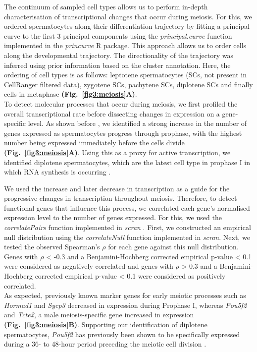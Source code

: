 The continuum of sampled cell types allows us to perform in-depth characterisation of transcriptional changes that occur during meiosis. 
For this, we ordered spermatocytes along their differentiation trajectory by fitting a principal curve \citep{Hastie1989} to the first 3 principal components using the \emph{principal.curve} function implemented in the \emph{princurve} R package. 
This approach allows us to order cells along the developmental trajectory. 
The directionality of the trajectory was inferred using prior information based on the cluster annotation. 
Here, the ordering of cell types is as follows: leptotene spermatocytes (SCs, not present in CellRanger filtered data), zygotene SCs, pachytene SCs, diplotene SCs and finally cells in metaphase \textbf{(Fig.~\ref{fig3:meiosis}A)}. \\

To detect molecular processes that occur during meiosis, we first profiled the overall transcriptional rate before dissecting changes in expression on a gene-specific level. 
As shown before \citep{Xia2018}, we identified a strong increase in the number of genes expressed as spermatocytes progress through prophase, with the highest number being expressed immediately before the cells divide \textbf{(Fig.~\ref{fig3:meiosis}A)}. 
Using this as a proxy for active transcription, we identified diplotene spermatocytes, which are the latest cell type in prophase I in which RNA synthesis is occurring \citep{Monesi1965}. 

\newpage

We used the increase and later decrease in transcription as a guide for the progressive changes in transcription throughout meiosis. 
Therefore, to detect functional genes that influence this process, we correlated each gene’s normalised expression level to the number of genes expressed. 
For this, we used the \emph{correlatePairs} function implemented in \emph{scran} \citep{Lun2016}. 
First, we constructed an empirical null distribution using the \emph{correlateNull} function implemented in \emph{scran}. 
Next, we tested the observed Spearman’s $\rho$ for each gene against this null distribution. 
Genes with $\rho$ < -0.3 and a Benjamini-Hochberg corrected empirical p-value < 0.1 were considered as negatively correlated and genes with $\rho$ > 0.3 and a Benjamini-Hochberg corrected empirical p-value < 0.1 were considered as positively correlated.\\

As expected, previously known marker genes for early meiotic processes such as \textit{Hormad1} and \textit{Sycp3} decreased in expression during Prophase I, whereas \textit{Pou5f2} and \textit{Tcte2}, a male meiosis-specific gene \citep{Braidotti1997} increased in expression \textbf{(Fig.~\ref{fig3:meiosis}B)}. 
Supporting our identification of diplotene spermatocytes, \textit{Pou5f2} has previously been shown to be specifically expressed during a 36- to 48-hour period preceding the meiotic cell division \citep{Andersen1993}. \\

